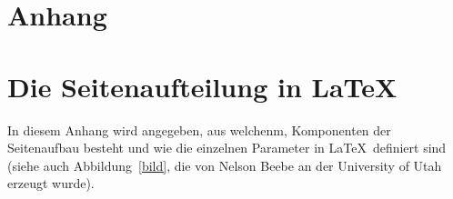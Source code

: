 
\clearpage

\section*{Anhang}

\appendix

\section{Die Seitenaufteilung in \LaTeX}

In diesem Anhang wird angegeben, aus welchenm, Komponenten der 
Seitenaufbau besteht und wie die einzelnen Parameter in \LaTeX\ 
definiert sind (siehe auch  
Abbildung~\ref{bild}, die von Nelson Beebe an der University of Utah 
erzeugt wurde).

